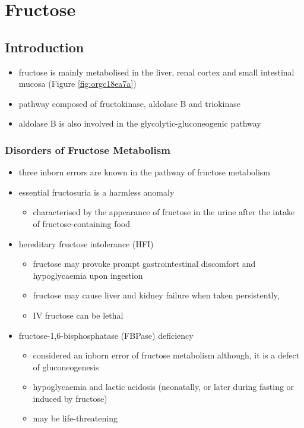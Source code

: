 \documentclass{scrartcl}
\begin{document}
\section{Fructose}
\label{sec:orgd837a3e}
\subsection{Introduction}
\label{sec:org537a4aa}
\begin{itemize}
\item fructose is mainly metabolised in the liver, renal cortex and small
intestinal mucosa (Figure \ref{fig:orgc18ea7a})
\item pathway composed of fructokinase, aldolase B and triokinase
\item aldolase B is also involved in the glycolytic-gluconeogenic pathway
\end{itemize}

\subsubsection{Disorders of Fructose Metabolism}
\label{sec:org29f7998}
\begin{itemize}
\item three inborn errors are known in the pathway of fructose metabolism
\item essential fructosuria is a harmless anomaly
\begin{itemize}
\item characterised by the appearance of fructose in the urine after the
intake of fructose-containing food
\end{itemize}
\item hereditary fructose intolerance (HFI)
\begin{itemize}
\item fructose may provoke prompt gastrointestinal discomfort and hypoglycaemia upon ingestion
\item fructose may cause liver and kidney failure when taken persistently,
\item IV fructose can be lethal
\end{itemize}
\item fructose-1,6-bisphosphatase (FBPase) deficiency
\begin{itemize}
\item considered an inborn error of fructose metabolism although, it is
a defect of gluconeogenesis
\item hypoglycaemia and lactic acidosis (neonatally, or later during
fasting or induced by fructose)
\item may be life-threatening
\end{itemize}
\end{itemize}
\end{document}

